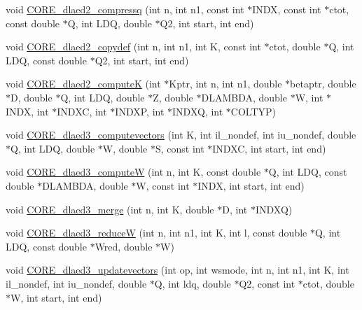 \begin{DoxyCompactItemize}
\item 
void \hyperlink{group__CORE__double_ga2bdc9efff9f2cae6d89fd67a162c7f2a_ga2bdc9efff9f2cae6d89fd67a162c7f2a}{C\+O\+R\+E\+\_\+dlaed2\+\_\+compressq} (int n, int n1, const int $\ast$I\+N\+D\+X, const int $\ast$ctot, const double $\ast$Q, int L\+D\+Q, double $\ast$Q2, int start, int end)
\item 
void \hyperlink{group__CORE__double_ga0b7db3e9b6066968ce09af2cdbe15ed1_ga0b7db3e9b6066968ce09af2cdbe15ed1}{C\+O\+R\+E\+\_\+dlaed2\+\_\+copydef} (int n, int n1, int K, const int $\ast$ctot, double $\ast$Q, int L\+D\+Q, const double $\ast$Q2, int start, int end)
\item 
void \hyperlink{group__CORE__double_ga6a307ebecf8a76fa174e00a626ac5f2b_ga6a307ebecf8a76fa174e00a626ac5f2b}{C\+O\+R\+E\+\_\+dlaed2\+\_\+compute\+K} (int $\ast$Kptr, int n, int n1, double $\ast$betaptr, double $\ast$D, double $\ast$Q, int L\+D\+Q, double $\ast$Z, double $\ast$D\+L\+A\+M\+B\+D\+A, double $\ast$W, int $\ast$I\+N\+D\+X, int $\ast$I\+N\+D\+X\+C, int $\ast$I\+N\+D\+X\+P, int $\ast$I\+N\+D\+X\+Q, int $\ast$C\+O\+L\+T\+Y\+P)
\item 
void \hyperlink{group__CORE__double_ga3be1c5d54e7c9c950f2b93cc1ffe1ef8_ga3be1c5d54e7c9c950f2b93cc1ffe1ef8}{C\+O\+R\+E\+\_\+dlaed3\+\_\+computevectors} (int K, int il\+\_\+nondef, int iu\+\_\+nondef, double $\ast$Q, int L\+D\+Q, double $\ast$W, double $\ast$S, const int $\ast$I\+N\+D\+X\+C, int start, int end)
\item 
void \hyperlink{group__CORE__double_gaa85a007085ddd54918d2097cb65df311_gaa85a007085ddd54918d2097cb65df311}{C\+O\+R\+E\+\_\+dlaed3\+\_\+compute\+W} (int n, int K, const double $\ast$Q, int L\+D\+Q, const double $\ast$D\+L\+A\+M\+B\+D\+A, double $\ast$W, const int $\ast$I\+N\+D\+X, int start, int end)
\item 
void \hyperlink{group__CORE__double_ga8d57d669e0bcef9e6fd1fd3a8592f697_ga8d57d669e0bcef9e6fd1fd3a8592f697}{C\+O\+R\+E\+\_\+dlaed3\+\_\+merge} (int n, int K, double $\ast$D, int $\ast$I\+N\+D\+X\+Q)
\item 
void \hyperlink{group__CORE__double_ga160f1c4633dd0ace97ce8ec2b89dd242_ga160f1c4633dd0ace97ce8ec2b89dd242}{C\+O\+R\+E\+\_\+dlaed3\+\_\+reduce\+W} (int n, int n1, int K, int l, const double $\ast$Q, int L\+D\+Q, const double $\ast$Wred, double $\ast$W)
\item 
void \hyperlink{group__CORE__double_ga3af898271ac8252073cd06625efc4df9_ga3af898271ac8252073cd06625efc4df9}{C\+O\+R\+E\+\_\+dlaed3\+\_\+updatevectors} (int op, int wsmode, int n, int n1, int K, int il\+\_\+nondef, int iu\+\_\+nondef, double $\ast$Q, int ldq, double $\ast$Q2, const int $\ast$ctot, double $\ast$W, int start, int end)

\end{DoxyCompactItemize}
